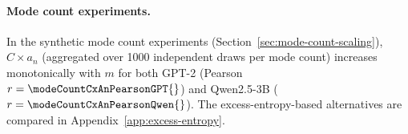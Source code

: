 \paragraph{Mode count experiments.} In the synthetic mode count experiments (Section~\ref{sec:mode-count-scaling}), $C \times a_n$ (aggregated over 1000 independent draws per mode count) increases monotonically with $m$ for both GPT-2 (Pearson $r = \modeCountCxAnPearsonGPT{}$) and Qwen2.5-3B ($r = \modeCountCxAnPearsonQwen{}$).
The excess-entropy-based alternatives are compared in Appendix~\ref{app:excess-entropy}.

